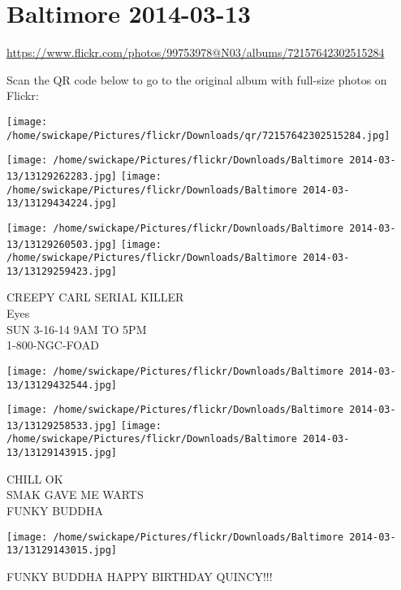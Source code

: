 \documentclass[10pt,letterpaper]{article}
\title{}
\author{}
\date{}
\begin{document}
\section*{Baltimore 2014-03-13}

\url{https://www.flickr.com/photos/99753978@N03/albums/72157642302515284}

Scan the QR code below to go to the original album with full-size photos on Flickr:

\texttt{[image: /home/swickape/Pictures/flickr/Downloads/qr/72157642302515284.jpg]}
\pagebreak

\texttt{[image: /home/swickape/Pictures/flickr/Downloads/Baltimore 2014-03-13/13129262283.jpg]}
\texttt{[image: /home/swickape/Pictures/flickr/Downloads/Baltimore 2014-03-13/13129434224.jpg]}

\texttt{[image: /home/swickape/Pictures/flickr/Downloads/Baltimore 2014-03-13/13129260503.jpg]}
\texttt{[image: /home/swickape/Pictures/flickr/Downloads/Baltimore 2014-03-13/13129259423.jpg]}

CREEPY CARL SERIAL KILLER\\
Eyes\\
SUN 3{-}16{-}14 9AM TO 5PM\\
1{-}800{-}NGC{-}FOAD
\pagebreak

\texttt{[image: /home/swickape/Pictures/flickr/Downloads/Baltimore 2014-03-13/13129432544.jpg]}

\vspace{0.25in}
\texttt{[image: /home/swickape/Pictures/flickr/Downloads/Baltimore 2014-03-13/13129258533.jpg]}
\texttt{[image: /home/swickape/Pictures/flickr/Downloads/Baltimore 2014-03-13/13129143915.jpg]}

CHILL OK\\
SMAK GAVE ME WARTS\\
FUNKY BUDDHA
\pagebreak

\texttt{[image: /home/swickape/Pictures/flickr/Downloads/Baltimore 2014-03-13/13129143015.jpg]}

FUNKY BUDDHA HAPPY BIRTHDAY QUINCY!!!
\pagebreak
\end{document}
